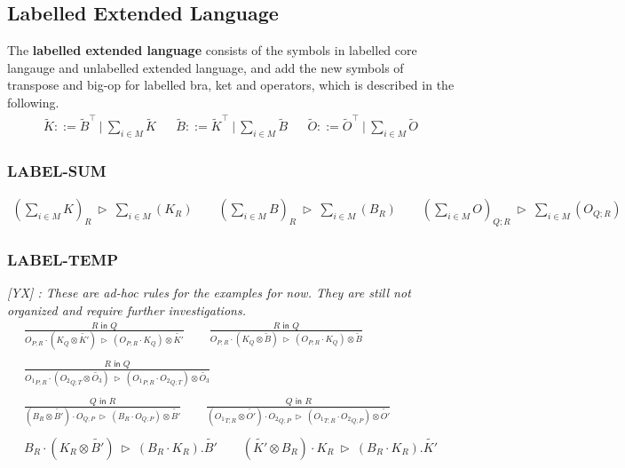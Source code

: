\documentclass[manuscript, review, timestamp]{acmart}
\newcommand{\yx}[1]{\textit{\color{blue}[YX] : #1}}
\newcommand*{\reduce}{\ \triangleright\ }
\begin{document}
\subsection{Labelled Extended Language}
\begin{definition}
  The \textbf{labelled extended language} consists of the symbols in labelled core langauge and unlabelled extended language, and add the new symbols of transpose and big-op for labelled bra, ket and operators, which is described in the following.
  \begin{align*}
    \tilde{K} ::= \tilde{B}^\top\ |\ \sum_{i \in M} \tilde{K}
    && \tilde{B} ::= \tilde{K}^\top\ |\ \sum_{i \in M} \tilde{B}
    && \tilde{O} ::= \tilde{O}^\top\ |\ \sum_{i \in M} \tilde{O}
  \end{align*}
  
\end{definition}


\subsubsection*{\textsf{LABEL-SUM}}
\begin{gather*}
  (\sum_{i \in M} K)_{R} \reduce \sum_{i \in M} (K_{R})
  \qquad
  (\sum_{i \in M} B)_{R} \reduce \sum_{i \in M} (B_{R})
  \qquad
  (\sum_{i \in M} O)_{Q; R} \reduce \sum_{i \in M} (O_{Q; R})
\end{gather*}

\subsubsection*{\textsf{LABEL-TEMP}}
\yx{These are ad-hoc rules for the examples for now. They are still not organized and require further investigations.}
\begin{gather*}
  \frac{R \textsf{ in } Q}{O_{P; R} \cdot (K_{Q} \otimes \tilde{K'}) \reduce (O_{P; R} \cdot K_{Q}) \otimes \tilde{K'}} 
  \qquad
  \frac{R \textsf{ in } Q}{O_{P; R} \cdot (K_{Q} \otimes \tilde{B}) \reduce (O_{P; R} \cdot K_{Q}) \otimes \tilde{B}} \\
  \\
  \frac{R \textsf{ in } Q}{{O_1}_{P; R} \cdot ({O_2}_{Q; T} \otimes \tilde{O_3}) \reduce ({O_1}_{P; R} \cdot {O_2}_{Q; T}) \otimes \tilde{O_3}} \\
  \\
  \frac{Q \textsf{ in } R}{(B_{R} \otimes \tilde{B'}) \cdot O_{Q;P} \reduce (B_{R} \cdot O_{Q;P}) \otimes \tilde{B'}} 
  \qquad
  \frac{Q \textsf{ in } R}{({O_1}_{T;R} \otimes \tilde{O'}) \cdot {O_2}_{Q;P} \reduce ({O_1}_{T;R} \cdot {O_2}_{Q;P}) \otimes \tilde{O'}} \\
  \\
  B_{R} \cdot (K_{R} \otimes \tilde{B'}) \reduce (B_{R} \cdot K_{R}) . \tilde{B'} 
  \qquad
  (\tilde{K'} \otimes B_{R}) \cdot K_{R} \reduce (B_{R} \cdot K_{R}) . \tilde{K'}
\end{gather*}
\end{document}

